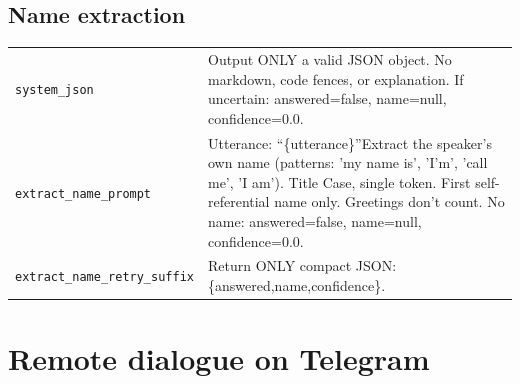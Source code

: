 \subsection*{Name extraction}
\begingroup
\footnotesize
{}
\begin{longtable}{@{}>{\raggedright\arraybackslash}p{}>{\raggedright\arraybackslash}p{}@{}}
    \toprule
    \endfirsthead
    \endhead
    \bottomrule
    \endfoot
        \texttt{system\_\allowbreak{}json} & Output ONLY a valid JSON object. No markdown, code fences, or explanation. If uncertain: answered=false, name=null, confidence=0.0. \\
        \texttt{extract\_\allowbreak{}name\_\allowbreak{}prompt} & Utterance: ``\{utterance\}''\newline Extract the speaker's own name (patterns: 'my name is', 'I'm', 'call me', 'I am'). Title Case, single token. First self-referential name only. Greetings don't count. No name: answered=false, name=null, confidence=0.0. \\
        \texttt{extract\_\allowbreak{}name\_\allowbreak{}retry\_\allowbreak{}suffix} & Return ONLY compact JSON: \{answered,\allowbreak{}name,\allowbreak{}confidence\}. \\
\end{longtable}
\endgroup

\section{Remote dialogue on Telegram}
